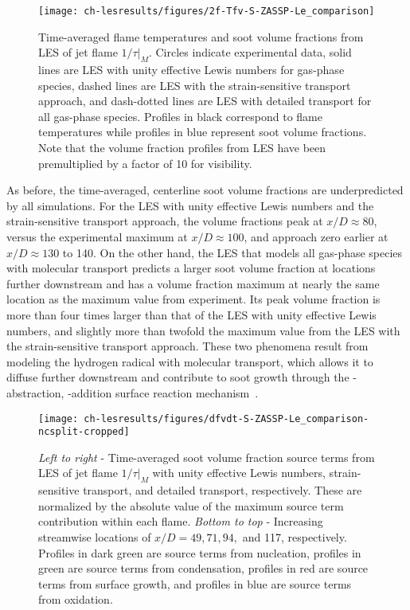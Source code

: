 \begin{figure}[H]
  \centering
  \texttt{[image: ch-lesresults/figures/2f-Tfv-S-ZASSP-Le\_comparison]}
  \caption[Centerline \texorpdfstring{$\langle T \rangle$}{<T>} \& \texorpdfstring{$\langle f_V \rangle$}{<fV>} from LES of Flame \texorpdfstring{$1/\tau|_M$}{1/t|M} with Various Transport Approaches]{Time-averaged flame temperatures and soot volume fractions from LES of jet flame $1/\tau|_M$. Circles indicate experimental data, solid lines are LES with unity effective Lewis numbers for gas-phase species, dashed lines are LES with the strain-sensitive transport approach, and dash-dotted lines are LES with detailed transport for all gas-phase species. Profiles in black correspond to flame temperatures while profiles in blue represent soot volume fractions. Note that the volume fraction profiles from LES have been premultiplied by a factor of 10 for visibility.}
  \label{fig:lesresults:ssta:f2lecomparison}
\end{figure}

As before, the time-averaged, centerline soot volume fractions are underpredicted by all simulations. For the LES with unity effective Lewis numbers and the strain-sensitive transport approach, the volume fractions peak at $x/D \approx 80$, versus the experimental maximum at $x/D \approx 100$, and approach zero earlier at $x/D \approx 130$ to 140. On the other hand, the LES that models all gas-phase species with molecular transport predicts a larger soot volume fraction at locations further downstream and has a volume fraction maximum at nearly the same location as the maximum value from experiment. Its peak volume fraction is more than four times larger than that of the LES with unity effective Lewis numbers, and slightly more than twofold the maximum value from the LES with the strain-sensitive transport approach. These two phenomena result from modeling the hydrogen radical with molecular transport, which allows it to diffuse further downstream and contribute to soot growth through the -abstraction, -addition surface reaction mechanism~\cite{frenklach1985,frenklach1991}.

\begin{figure}[H]
  \centering
  \texttt{[image: ch-lesresults/figures/dfvdt-S-ZASSP-Le\_comparison-ncsplit-cropped]}
  \caption[Radial \texorpdfstring{$\langle df_V/dt \rangle/|\langle df_V/dt|_{\text{max}} \rangle|$}{<dfV/dt>/|<dfV/dt>|max|} from LES with Various Transport Approaches]{\textit{Left to right} - Time-averaged soot volume fraction source terms from LES of jet flame $1/\tau|_M$ with unity effective Lewis numbers, strain-sensitive transport, and detailed transport, respectively. These are normalized by the absolute value of the maximum source term contribution within each flame. \textit{Bottom to top} - Increasing streamwise locations of $x/D = 49, 71, 94,$ and 117, respectively. Profiles in dark green are source terms from nucleation, profiles in green are source terms from condensation, profiles in red are source terms from surface growth, and profiles in blue are source terms from oxidation.}
  \label{fig:lesresults:ssta:radialdfvdtf2lecomparison}
\end{figure}

